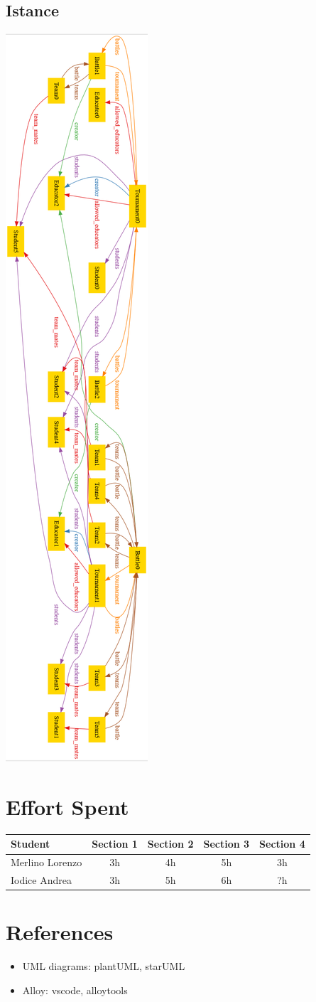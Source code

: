 \documentclass{article}
\begin{document}
\subsection{Istance}
\begin{center}
  \includegraphics[width=0.25\linewidth]{istance.png}
\label{fig:uc13}
\end{center}

\newpage
\section{Effort Spent}
\begin{center}
\begin{tabular}{||l|c|c|c|c||}
\hline
Student & Section 1 & Section 2 & Section 3 & Section 4
\\
\hline
Merlino Lorenzo & 3h & 4h & 5h & 3h
\\
\hline
Iodice Andrea & 3h & 5h & 6h & ?h
\\
\hline
\end{tabular}
\end{center}

\newpage
\section{References}
\begin{itemize}
\item UML diagrams: plantUML, starUML
\item Alloy: vscode, alloytools
\end{itemize}
\end{document}
